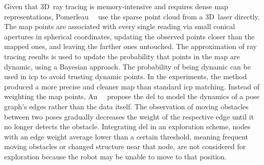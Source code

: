 Given that 3D~ray tracing is memory-intensive and requires
dense map representations, Pomerleau~\etal~\cite{pomerleau:icra:2014}
use the sparse point cloud from a 3D~laser directly.
The map points are associated with every single reading
via small conical apertures in spherical coordinates,
updating the observed points closer than the mapped ones,
and leaving the farther ones untouched.
The approximation of ray tracing results is used to update
the probability that points in the map are dynamic,
using a Bayesian approach. The probability of being dynamic can be used
in \gls{icp} to avoid trusting dynamic points.
In the experiments, the method~\cite{pomerleau:icra:2014} produced a more
precise and cleaner map than standard \gls{icp} matching.
Instead of weighting the map points, An~\etal~\cite{an:as:2016} propose the
\gls{del} to model the dynamics of a pose graph's edges
rather than the data itself. The observation of moving obstacles
between two poses gradually decreases the weight of the respective edge
until it no longer detects the obstacle.
Integrating \gls{del} in an exploration scheme,
nodes with an edge weight average lower than a certain threshold,
meaning frequent moving obstacles or changed structure near that node,
are not considered for exploration because the robot may be
unable to move to that position.

